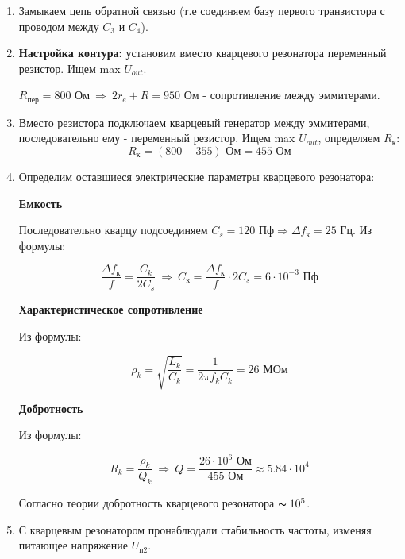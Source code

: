 \begin{enumerate}
    \item Замыкаем цепь обратной связью (т.е соединяем базу первого транзистора с проводом между $C_3$ и $C_4$).
    
    \item \textbf{Настройка контура:} установим вместо кварцевого резонатора переменный резистор. Ищем max $U_{out}$.
    
    $R_{пер} = 800 \text{ Ом} \: \Rightarrow \: 2r_e + R = 950 \text{ Ом}$ - сопротивление между эммитерами.  
    \item Вместо резистора подключаем кварцевый генератор между эммитерами, последовательно ему - переменный резистор. Ищем max $U_{out}$, определяем $R_к$:
    \[ R_к = (800 - 355) \text{ Ом} = 455  \text{ Ом}\]

    \item Определим оставшиеся электрические параметры кварцевого резонатора:
    
    \textbf{Емкость}

    Последовательно кварцу подсоединяем $C_s = 120 \text{ Пф} \Rightarrow \Delta f_к = 25 \text{ Гц}$.
    Из формулы:

    \[ \frac{\Delta f_к}{f} = \frac{C_k}{2C_s} \: \Rightarrow \: C_{к} = \frac{\Delta f_к}{f} \cdot 2C_s = 6 \cdot 10^{-3} \text{ Пф} \]

    \textbf{Характеристическое сопротивление}

    Из формулы:

    \[ \rho_k = \sqrt{\frac{L_k}{C_k}} = \frac{1}{2\pi f_k C_k} = 26  \text{ МОм}\]

    \textbf{Добротность}
    
    Из формулы:

    \[ R_k = \frac{\rho_k}{Q_k} \: \Rightarrow \: Q = \frac{26 \cdot 10^6 \text{ Ом}}{455 \text{ Ом}} \approx 5.84 \cdot 10^{4} \]

    Согласно теории добротность кварцевого резонатора $\thicksim 10^{5}$.

    \item С кварцевым резонатором пронаблюдали стабильность частоты, изменяя питающее напряжение $U_{п2}$.
    
\end{enumerate}

